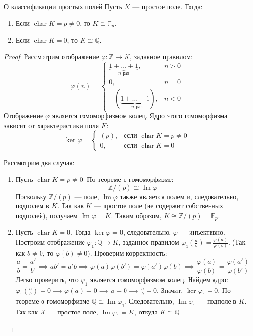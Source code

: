 \begin{Theorem}{О классификации простых полей}{}
	Пусть $K$ --- простое поле. Тогда:
	\begin{enumerate}
		\item Если $\operatorname{char} K = p \neq 0$, то $K \cong \mathbb{F}_p$.
		\item Если $\operatorname{char} K = 0$, то $K \cong \mathbb{Q}$.
	\end{enumerate}
\end{Theorem}

\begin{proof}
	Рассмотрим отображение $\varphi\colon \mathbb{Z} \to K$, заданное правилом:
	\[
	\varphi(n) = 
	\begin{cases} 
		\underbrace{1 + \dots + 1}_{n \text{ раз}}, & n > 0 \\
		0, & n = 0 \\
		-(\underbrace{1 + \dots + 1}_{-n \text{ раз}}), & n < 0 
	\end{cases}
	\]
	Отображение $\varphi$ является гомоморфизмом колец. Ядро этого гомоморфизма зависит от характеристики поля $K$:
	\[
	\ker\varphi = 
	\begin{cases} 
		(p), & \text{если } \operatorname{char} K = p \neq 0 \\
		0, & \text{если } \operatorname{char} K = 0 
	\end{cases}
	\]
	
	Рассмотрим два случая:
	\begin{enumerate}
		\item Пусть $\operatorname{char} K = p \neq 0$. По теореме о гомоморфизме:
		\[ \mathbb{Z}/(p) \cong \operatorname{Im}\varphi \]
		Поскольку $\mathbb{Z}/(p)$ --- поле, $\operatorname{Im}\varphi$ также является полем и, следовательно, подполем в $K$. Так как $K$ --- простое поле (не содержит собственных подполей), получаем $\operatorname{Im}\varphi = K$. Таким образом, $K \cong \mathbb{Z}/(p) = \mathbb{F}_p$.
		
		\item Пусть $\operatorname{char} K = 0$. Тогда $\ker\varphi = 0$, следовательно, $\varphi$ --- инъективно.
		Построим отображение $\varphi_1\colon \mathbb{Q} \to K$, заданное правилом $\varphi_1\left(\frac{a}{b}\right) = \frac{\varphi(a)}{\varphi(b)}$. (Так как $b \neq 0$, то $\varphi(b) \neq 0$).
		Проверим корректность:
		\[ \frac{a}{b} = \frac{a'}{b'} \implies ab' = a'b \implies \varphi(a)\varphi(b') = \varphi(a')\varphi(b) \implies \frac{\varphi(a)}{\varphi(b)} = \frac{\varphi(a')}{\varphi(b')} \]
		Легко проверить, что $\varphi_1$ является гомоморфизмом колец. 
		Найдем ядро: $\varphi_1\left(\frac{a}{b}\right) = 0 \implies \varphi(a) = 0 \implies a = 0 \implies \frac{a}{b} = 0$. Значит, $\ker\varphi_1 = 0$.
		По теореме о гомоморфизме $\mathbb{Q} \cong \operatorname{Im}\varphi_1$. 
		Следовательно, $\operatorname{Im}\varphi_1$ --- подполе в $K$. Так как $K$ --- простое поле, $\operatorname{Im}\varphi_1 = K$, откуда $K \cong \mathbb{Q}$.
	\end{enumerate}
\end{proof}

